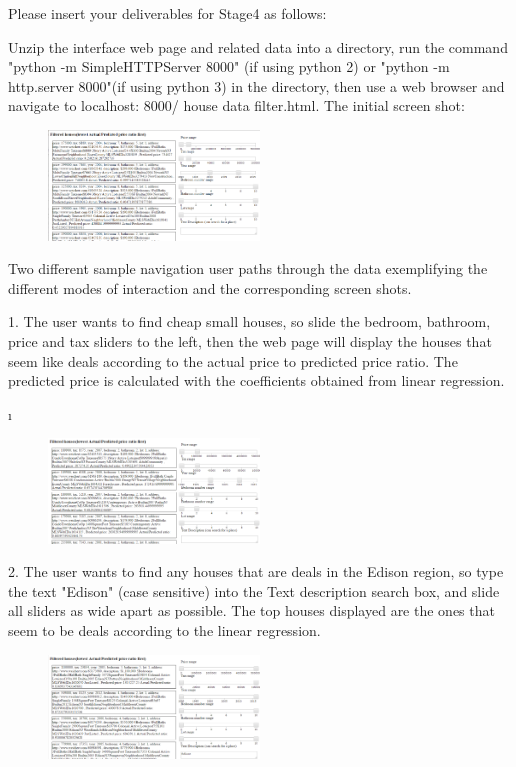 
Please insert your deliverables for Stage4 as follows:
\begin{itemize} 
\item{Unzip the interface web page and related data into a directory, run the command "python -m SimpleHTTPServer 8000" (if using python 2) or "python -m http.server 8000"(if using python 3) in the directory, then use a web browser and navigate to localhost: 8000/ house data filter.html. The initial screen shot:
\begin{figure}
\centering
\includegraphics[width=0.5\textwidth]{houseinitial.png}
\caption{}
\end{figure}

	
\item{Two different  sample navigation user paths through the data exemplifying the different modes of interaction and the corresponding screen shots. 

1. The user wants to find cheap small houses, so slide the bedroom, bathroom, price and tax sliders to the left, then the web page will display the houses that seem like deals according to the actual price to predicted price ratio. The predicted price is calculated with the coefficients obtained from linear regression.

\i\begin{figure}
\centering
\includegraphics[width=0.5\textwidth]{housesmall.png}
\caption{}
\end{figure}

2. The user wants to find any houses that are deals in the Edison region, so type the text "Edison" (case sensitive) into the Text description search box, and slide all sliders as wide apart as possible. The top houses displayed are the ones that seem to be deals according to the linear regression.

\begin{figure}
\centering
\includegraphics[width=0.5\textwidth]{houseedison.png}
\caption{}
\end{figure}

}}
\end{itemize}
